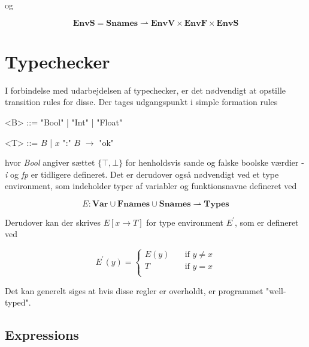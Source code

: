 \noindent og

$$ \textbf{EnvS} = \textbf{Snames} \rightharpoonup \textbf{EnvV} \times \textbf{EnvF} \times \textbf{EnvS} $$
\pagebreak

\tocless \section{Typechecker}
\noindent I forbindelse med udarbejdelsen af typechecker, er det nødvendigt at opstille transition rules for disse. Der tages udgangspunkt i simple formation rules

\begin{grammar}
    \centering
    <B> ::= "Bool" | "Int" | "Float"
    
    <T> ::= $B$ | $x$ ":" $B$ $\rightarrow$ "ok"
\end{grammar}

\noindent hvor \textit{Bool} angiver sættet $\{\top, \bot\}$ for henholdsvis sande og falske boolske værdier - \textit{i} og \textit{fp} er tidligere defineret. Det er derudover også nødvendigt ved et type environment, som indeholder typer af variabler og funktionsnavne defineret ved 

$$ E : \textbf{Var} \cup \textbf{Fnames} \cup \textbf{Snames} \rightharpoonup \textbf{Types} $$

\noindent Derudover kan der skrives $E[x \rightarrow T]$ for type environment $E^\prime$, som er defineret ved 

\[ E^\prime(y) =
  \begin{cases}
    E(y)       & \quad \text{if } y \ne x\\
    T          & \quad \text{if } y = x\\
  \end{cases}
\]

\noindent Det kan generelt siges at hvis disse regler er overholdt, er programmet "well-typed"\mbox{}.

\tocless \subsection{Expressions}

